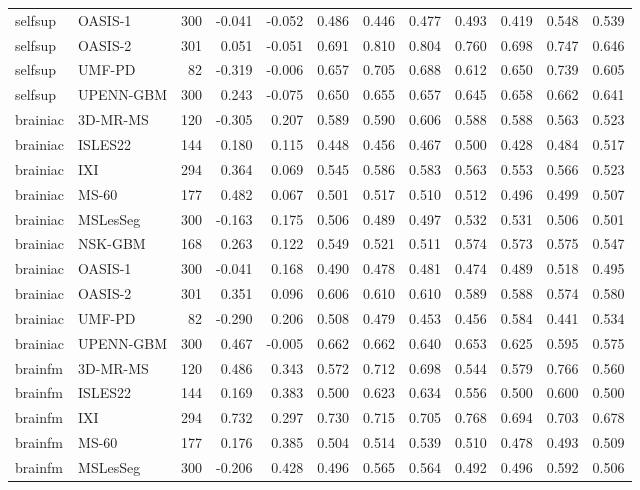 \begin{tabular}{llrrrrrrrrrr}
selfsup & OASIS-1 & 300 & -0.041 & -0.052 & 0.486 & 0.446 & 0.477 & 0.493 & 0.419 & 0.548 & 0.539 \\
selfsup & OASIS-2 & 301 & 0.051 & -0.051 & 0.691 & 0.810 & 0.804 & 0.760 & 0.698 & 0.747 & 0.646 \\
selfsup & UMF-PD & 82 & -0.319 & -0.006 & 0.657 & 0.705 & 0.688 & 0.612 & 0.650 & 0.739 & 0.605 \\
selfsup & UPENN-GBM & 300 & 0.243 & -0.075 & 0.650 & 0.655 & 0.657 & 0.645 & 0.658 & 0.662 & 0.641 \\
brainiac & 3D-MR-MS & 120 & -0.305 & 0.207 & 0.589 & 0.590 & 0.606 & 0.588 & 0.588 & 0.563 & 0.523 \\
brainiac & ISLES22 & 144 & 0.180 & 0.115 & 0.448 & 0.456 & 0.467 & 0.500 & 0.428 & 0.484 & 0.517 \\
brainiac & IXI & 294 & 0.364 & 0.069 & 0.545 & 0.586 & 0.583 & 0.563 & 0.553 & 0.566 & 0.523 \\
brainiac & MS-60 & 177 & 0.482 & 0.067 & 0.501 & 0.517 & 0.510 & 0.512 & 0.496 & 0.499 & 0.507 \\
brainiac & MSLesSeg & 300 & -0.163 & 0.175 & 0.506 & 0.489 & 0.497 & 0.532 & 0.531 & 0.506 & 0.501 \\
brainiac & NSK-GBM & 168 & 0.263 & 0.122 & 0.549 & 0.521 & 0.511 & 0.574 & 0.573 & 0.575 & 0.547 \\
brainiac & OASIS-1 & 300 & -0.041 & 0.168 & 0.490 & 0.478 & 0.481 & 0.474 & 0.489 & 0.518 & 0.495 \\
brainiac & OASIS-2 & 301 & 0.351 & 0.096 & 0.606 & 0.610 & 0.610 & 0.589 & 0.588 & 0.574 & 0.580 \\
brainiac & UMF-PD & 82 & -0.290 & 0.206 & 0.508 & 0.479 & 0.453 & 0.456 & 0.584 & 0.441 & 0.534 \\
brainiac & UPENN-GBM & 300 & 0.467 & -0.005 & 0.662 & 0.662 & 0.640 & 0.653 & 0.625 & 0.595 & 0.575 \\
brainfm & 3D-MR-MS & 120 & 0.486 & 0.343 & 0.572 & 0.712 & 0.698 & 0.544 & 0.579 & 0.766 & 0.560 \\
brainfm & ISLES22 & 144 & 0.169 & 0.383 & 0.500 & 0.623 & 0.634 & 0.556 & 0.500 & 0.600 & 0.500 \\
brainfm & IXI & 294 & 0.732 & 0.297 & 0.730 & 0.715 & 0.705 & 0.768 & 0.694 & 0.703 & 0.678 \\
brainfm & MS-60 & 177 & 0.176 & 0.385 & 0.504 & 0.514 & 0.539 & 0.510 & 0.478 & 0.493 & 0.509 \\
brainfm & MSLesSeg & 300 & -0.206 & 0.428 & 0.496 & 0.565 & 0.564 & 0.492 & 0.496 & 0.592 & 0.506 \\

\end{tabular}
